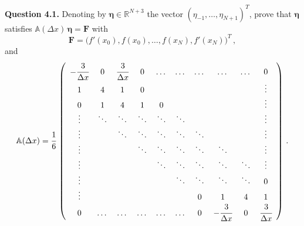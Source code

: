 \documentclass[10pt]{article}
\newcommand{\R}{{\mathbb R}}
\begin{document}
\begin{leftbar}
\textbf{Question 4.1.} Denoting by $\bm{\eta} \in \R^{N+3}$ the vector $(\eta_{-1},\dots,\eta_{N+1})^{T}$, prove that $\bm{\eta}$ satisfies $\mathbb{A}(\Delta x)\,\bm{\eta} = \mathbf{F}$ with
\begin{equation}
\mathbf{F} = \big( f'(x_{0}),f(x_{0}),\dots,f(x_{N}),f'(x_{N})\big)^{T} \, ,
\end{equation}
and
\begin{equation}
\mathbb{A}(\Delta x) = \cfrac{1}{6}\,\left(
\begin{array}{cccccccccc}
-\cfrac{3}{\Delta x} & 0      & \cfrac{3}{\Delta x} & 0      & \dots  & \dots  & \dots  & \dots                & \dots  & 0 \\
1                    & 4      & 1                   & 0      &        &        &        &                      &        & \vdots \\
0                    & 1      & 4                   & 1      & 0      &        &        &                      &        & \vdots \\
\vdots               & \ddots & \ddots              & \ddots & \ddots & \ddots &        &                      &        & \vdots \\
\vdots               &        & \ddots              & \ddots & \ddots & \ddots & \ddots &                      &        & \vdots \\
\vdots               &        &                     & \ddots & \ddots & \ddots & \ddots & \ddots               &        & \vdots \\
\vdots               &        &                     &        & \ddots & \ddots & \ddots & \ddots               & \ddots & \vdots \\
\vdots               &        &                     &        &        & \ddots & \ddots & \ddots               & \ddots & 0 \\
\vdots               &        &                     &        &        &        & 0      & 1                    & 4      & 1 \\
0                    & \dots  & \dots               & \dots  & \dots  & \dots  & 0      & -\cfrac{3}{\Delta x} & 0      & \cfrac{3}{\Delta x}
\end{array}
\right) \, .
\end{equation}
\end{leftbar}
\end{document}
